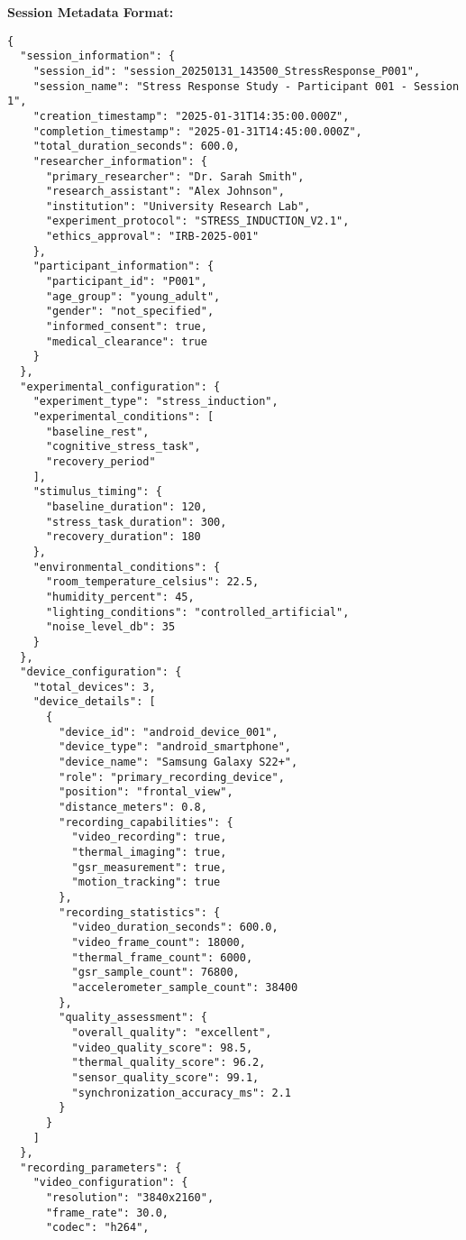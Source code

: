 \documentclass[12pt,a4paper]{article}
\begin{document}
\textbf{Session Metadata Format:}

\begin{verbatim}
{
  "session_information": {
    "session_id": "session_20250131_143500_StressResponse_P001",
    "session_name": "Stress Response Study - Participant 001 - Session 1",
    "creation_timestamp": "2025-01-31T14:35:00.000Z",
    "completion_timestamp": "2025-01-31T14:45:00.000Z",
    "total_duration_seconds": 600.0,
    "researcher_information": {
      "primary_researcher": "Dr. Sarah Smith",
      "research_assistant": "Alex Johnson",
      "institution": "University Research Lab",
      "experiment_protocol": "STRESS_INDUCTION_V2.1",
      "ethics_approval": "IRB-2025-001"
    },
    "participant_information": {
      "participant_id": "P001",
      "age_group": "young_adult",
      "gender": "not_specified",
      "informed_consent": true,
      "medical_clearance": true
    }
  },
  "experimental_configuration": {
    "experiment_type": "stress_induction",
    "experimental_conditions": [
      "baseline_rest",
      "cognitive_stress_task", 
      "recovery_period"
    ],
    "stimulus_timing": {
      "baseline_duration": 120,
      "stress_task_duration": 300,
      "recovery_duration": 180
    },
    "environmental_conditions": {
      "room_temperature_celsius": 22.5,
      "humidity_percent": 45,
      "lighting_conditions": "controlled_artificial",
      "noise_level_db": 35
    }
  },
  "device_configuration": {
    "total_devices": 3,
    "device_details": [
      {
        "device_id": "android_device_001",
        "device_type": "android_smartphone",
        "device_name": "Samsung Galaxy S22+",
        "role": "primary_recording_device",
        "position": "frontal_view",
        "distance_meters": 0.8,
        "recording_capabilities": {
          "video_recording": true,
          "thermal_imaging": true,
          "gsr_measurement": true,
          "motion_tracking": true
        },
        "recording_statistics": {
          "video_duration_seconds": 600.0,
          "video_frame_count": 18000,
          "thermal_frame_count": 6000,
          "gsr_sample_count": 76800,
          "accelerometer_sample_count": 38400
        },
        "quality_assessment": {
          "overall_quality": "excellent",
          "video_quality_score": 98.5,
          "thermal_quality_score": 96.2,
          "sensor_quality_score": 99.1,
          "synchronization_accuracy_ms": 2.1
        }
      }
    ]
  },
  "recording_parameters": {
    "video_configuration": {
      "resolution": "3840x2160",
      "frame_rate": 30.0,
      "codec": "h264",

\end{verbatim}
\end{document}
